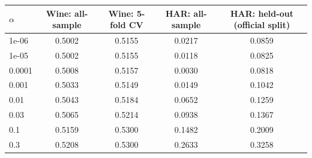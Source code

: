 \begin{tabular}{lcccc}
\toprule
$\alpha$ & Wine: all-sample & Wine: 5-fold CV & HAR: all-sample & HAR: held-out (official split) \\
\midrule
1e-06 & 0.5002 & 0.5155 & 0.0217 & 0.0859 \\
1e-05 & 0.5002 & 0.5155 & 0.0118 & 0.0825 \\
0.0001 & 0.5008 & 0.5157 & 0.0030 & 0.0818 \\
0.001 & 0.5033 & 0.5149 & 0.0149 & 0.1042 \\
0.01 & 0.5043 & 0.5184 & 0.0652 & 0.1259 \\
0.03 & 0.5065 & 0.5214 & 0.0938 & 0.1367 \\
0.1 & 0.5159 & 0.5300 & 0.1482 & 0.2009 \\
0.3 & 0.5208 & 0.5300 & 0.2633 & 0.3258 \\
\bottomrule
\end{tabular}
